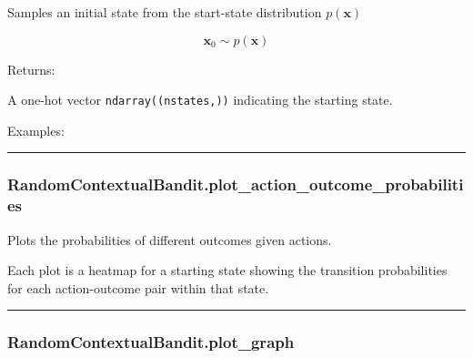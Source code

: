 Samples an initial state from the start-state distribution
\(p(\mathbf x)\)

\[
\mathbf x_0 \sim p(\mathbf x)
\]

Returns:

A one-hot vector \texttt{ndarray((nstates,))} indicating the starting
state.

Examples:

\begin{Shaded}
\begin{Highlighting}[]
\OperatorTok{=}
\end{Highlighting}
\end{Shaded}

\begin{center}\rule{0.5\linewidth}{\linethickness}\end{center}

\hypertarget{randomcontextualbandit.plot_action_outcome_probabilities}{%
\subsubsection{RandomContextualBandit.plot\_action\_outcome\_probabilities}\label{randomcontextualbandit.plot_action_outcome_probabilities}}

\begin{Shaded}
\begin{Highlighting}[]
\OperatorTok{=}\OperatorTok{=}\OperatorTok{=}\OperatorTok{=}\NormalTok{)}
\end{Highlighting}
\end{Shaded}

Plots the probabilities of different outcomes given actions.

Each plot is a heatmap for a starting state showing the transition
probabilities for each action-outcome pair within that state.

\begin{center}\rule{0.5\linewidth}{\linethickness}\end{center}

\hypertarget{randomcontextualbandit.plot_graph}{%
\subsubsection{RandomContextualBandit.plot\_graph}\label{randomcontextualbandit.plot_graph}}


